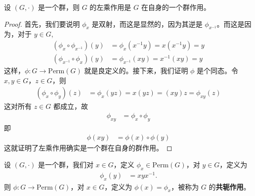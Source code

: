 \documentclass[../../main.tex]{subfiles}
\begin{document}
\begin{proposition}\label{proposition:左乘作用是群作用}
设 \((G, \cdot)\) 是一个群，则 \(G\) 的左乘作用是 \(G\) 在自身的一个群作用。
\end{proposition}
\begin{proof}
首先，我们要说明 \(\phi_x\) 是双射，而这是显然的，因为其逆是 \(\phi_{x^{-1}}\)。而这是因为，对于 \(y \in G\),
\begin{align*}
(\phi_x \circ \phi_{x^{-1}})(y) &= \phi_x(x^{-1}y) = x(x^{-1}y) = y\\
(\phi_{x^{-1}} \circ \phi_x)(y) &= \phi_{x^{-1}}(xy) = x^{-1}(xy) = y
\end{align*}
这样，\(\phi: G \to \mathrm{Perm}(G)\) 就是良定义的。接下来，我们证明 \(\phi\) 是个同态。令 \(x, y \in G\)，\(z \in G\)，则
\begin{align*}
(\phi_x \circ \phi_y)(z) &= \phi_x(yz) = x(yz) = (xy)z = \phi_{xy}(z)
\end{align*}
这对所有 \(z \in G\) 都成立，故
\begin{align*}
\phi_{xy} &= \phi_x \circ \phi_y
\end{align*}
即
\begin{align*}
\phi(xy) &= \phi(x) \circ \phi(y)
\end{align*}
这就证明了左乘作用确实是一个群在自身的群作用。 
\end{proof}

\begin{definition}[共轭作用]
设 \((G, \cdot)\) 是一个群，我们对 \(x \in G\)，定义 \(\phi_x \in \mathrm{Perm}(G)\)，对 \(y \in G\)，定义为
\begin{align*}
\phi_x(y) &= xyx^{-1}.
\end{align*}
则 \(\phi: G \to \mathrm{Perm}(G)\)，对 \(x \in G\)，定义为 \(\phi(x) = \phi_x\)，被称为 \(G\) 的\textbf{共轭作用}。 
\end{definition}
\end{document}
